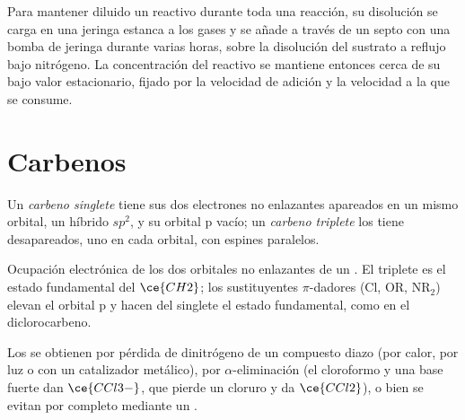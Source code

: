 \begin{inthelab}
Para mantener diluido un reactivo durante toda una reacción, su disolución se carga en una
jeringa estanca a los gases y se añade a través de un septo con una bomba de jeringa durante varias
horas, sobre la disolución del sustrato a reflujo bajo nitrógeno. La
concentración del reactivo se mantiene entonces cerca de su bajo valor estacionario, fijado por
la velocidad de adición y la velocidad a la que se consume.
\end{inthelab}

\section{Carbenos}

\begin{definition}\label{def:b3:radicals-carbenes:carbene-states}
Un \emph{carbeno singlete} tiene sus dos electrones no
enlazantes apareados en un mismo orbital, un híbrido $sp^2$, y su orbital p vacío; un
\emph{carbeno triplete} los tiene desapareados, uno en cada
orbital, con espines paralelos.
\end{definition}

\begin{omfigure}

{\small Ocupación electrónica de los dos orbitales no enlazantes de un . El
triplete es el estado fundamental del $\ce{CH2}$; los sustituyentes $\pi$-dadores (Cl, OR, $\mathrm{NR_2}$) elevan el
orbital p y hacen del singlete el estado fundamental, como en el diclorocarbeno.}
\end{omfigure}

Los  se obtienen por pérdida de dinitrógeno de un compuesto diazo (por calor, por luz
o con un catalizador metálico), por $\alpha$-eliminación (el cloroformo y una base fuerte dan
$\ce{CCl3-}$, que pierde un cloruro y da $\ce{CCl2}$), o bien se evitan por completo mediante un
.

